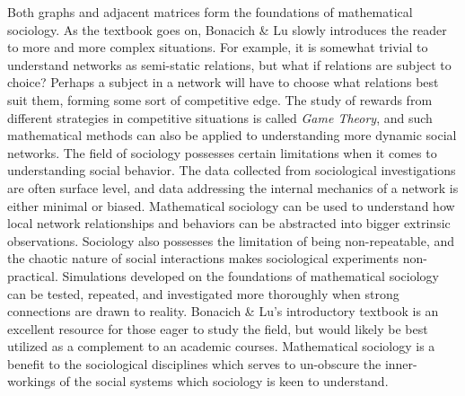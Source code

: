 \documentclass{article}
\begin{document}
    \hspace{20pt} Both graphs and adjacent matrices form the foundations of mathematical sociology. As the textbook goes on, Bonacich \& Lu slowly introduces the reader to more and more complex situations. For example, it is somewhat trivial to understand networks as semi-static relations, but what if relations are subject to choice? Perhaps a subject in a network will have to choose what relations best suit them, forming some sort of competitive edge. The study of rewards from different strategies in competitive situations is called {\em \large Game Theory}, and such mathematical methods can also be applied to understanding more dynamic social networks. The field of sociology possesses certain limitations when it comes to understanding social behavior. The data collected from sociological investigations are often surface level, and data addressing the internal mechanics of a network is either minimal or biased. Mathematical sociology can be used to understand how local network relationships and behaviors can be abstracted into bigger extrinsic observations. Sociology also possesses the limitation of being non-repeatable, and the chaotic nature of social interactions makes sociological experiments non-practical. Simulations developed on the foundations of mathematical sociology can be tested, repeated, and investigated more thoroughly when strong connections are drawn to reality. Bonacich \& Lu's introductory textbook is an excellent resource for those eager to study the field, but would likely be best utilized as a complement to an academic courses. Mathematical sociology is a benefit to the sociological disciplines which serves to un-obscure the inner-workings of the social systems which sociology is keen to understand.
\end{document}
